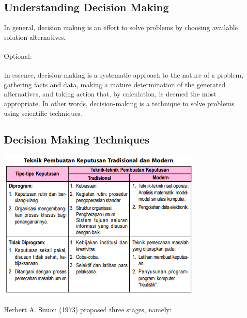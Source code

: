 \documentclass[12pt,titlepage]{article}
\begin{document}
\subsection{Understanding Decision Making}
\noindent
In general, decision making is an effort to solve problems by choosing available solution alternatives.\\\\
Optional:\\\\
In essence, decision-making is a systematic approach to the nature of a problem, gathering facts and data, making a mature determination of the generated alternatives, and taking action that, by calculation, is deemed the most appropriate. In other words, decision-making is a technique to solve problems using scientific techniques.
\subsection{Decision Making Techniques} \noindent
\begin{center}
    \includegraphics[width=.9\textwidth]{images/figures/fig1.png}
\end{center}
Herbert A. Simon (1973) proposed three stages, namely:
\end{document}
